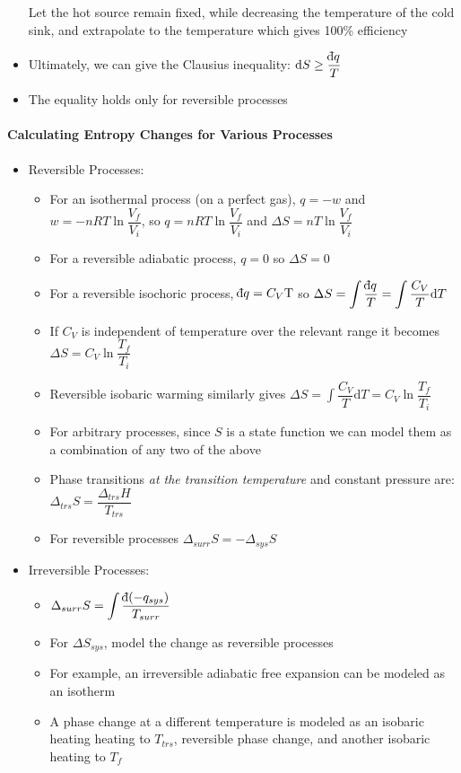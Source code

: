 \documentclass[12pt, openany, letterpaper]{memoir}
\begin{document}
\begin{itemize}
	      Let the hot source remain fixed, while decreasing the temperature of the cold sink, and extrapolate to the temperature which gives 100\% efficiency
	\item Ultimately, we can give the Clausius inequality: $\mathrm{d}S\geq\dfrac{\dbar q}{T}$
	\item The equality holds only for reversible processes
\end{itemize}
\paragraph{Calculating Entropy Changes for Various Processes}
\begin{itemize}
	\item Reversible Processes:
	      \begin{itemize}
		      \item For an isothermal process (on a perfect gas), $q = - w$ and $w = -nRT\ln\dfrac{V_f}{V_i}$, so $q = nRT\ln\dfrac{V_f}{V_i}$ and $\Delta S = nT\ln\dfrac{V_f}{V_i}$
		      \item For a reversible adiabatic process, $q=0$ so $\Delta S =0$
		      \item For a reversible isochoric process, $\dbar q=C_V\mathrm{T}$ so $\Delta S = \displaystyle\int\dfrac{\dbar q}{T} = \int\dfrac{C_V}{T}\mathrm{d}T$
		      \item If $C_V$ is independent of temperature over the relevant range it becomes $\Delta S = C_V\ln\dfrac{T_f}{T_i}$
		      \item Reversible isobaric warming similarly gives $\Delta S = \int\dfrac{C_V}{T}\mathrm{d}T = C_V\ln\dfrac{T_f}{T_i}$
		      \item For arbitrary processes, since $S$ is a state function we can model them as a combination of any two of the above
		      \item Phase transitions \emph{at the transition temperature} and constant pressure are: $\Delta_{trs}S=\dfrac{\Delta_{trs}H}{T_{trs}}$
		      \item For reversible processes $\Delta_{surr}S = -\Delta_{sys}S$
	      \end{itemize}
	\item Irreversible Processes:
	      \begin{itemize}
		      \item $\Delta_{surr}S = \displaystyle\int\dfrac{\dbar (-q_{sys})}{T_{surr}}$
		      \item For $\Delta S_{sys}$, model the change as reversible processes
		      \item For example, an irreversible adiabatic free expansion can be modeled as an isotherm
		      \item A phase change at a different temperature is modeled as an isobaric heating heating to $T_{trs}$, reversible phase change, and another isobaric heating to $T_f$
	      \end{itemize}
\end{itemize}
\end{document}

